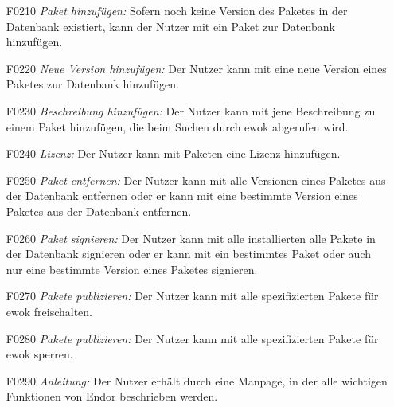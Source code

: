 \begin{itemize}
	\item[F0210] \textit{Paket hinzufügen:} Sofern noch keine Version des Paketes in der Datenbank existiert, kann der Nutzer mit  ein Paket zur Datenbank hinzufügen.
	\item[F0220] \textit{Neue Version hinzufügen:} Der Nutzer kann mit  eine neue Version eines Paketes zur Datenbank hinzufügen.
	\item[F0230] \textit{Beschreibung hinzufügen:} Der Nutzer kann mit  jene Beschreibung zu einem Paket hinzufügen, die beim Suchen durch ewok abgerufen wird.
	\item[F0240] \textit{Lizenz:} Der Nutzer kann mit  Paketen eine Lizenz hinzufügen.
	\item[F0250] \textit{Paket entfernen:} Der Nutzer kann mit  alle Versionen eines Paketes aus der Datenbank entfernen oder er kann mit  eine bestimmte Version eines Paketes aus der Datenbank entfernen.
	\item[F0260] \textit{Paket signieren:} Der Nutzer kann mit  alle installierten alle Pakete in der Datenbank signieren oder er kann mit  ein bestimmtes Paket oder auch nur eine bestimmte Version eines Paketes signieren.
	\item[F0270] \textit{Pakete publizieren:} Der Nutzer kann mit  alle spezifizierten Pakete für ewok freischalten.
	\item[F0280] \textit{Pakete publizieren:} Der Nutzer kann mit  alle spezifizierten Pakete für ewok sperren.
	\item[F0290] \textit{Anleitung:} Der Nutzer erhält durch  eine Manpage, in der alle wichtigen Funktionen von Endor beschrieben werden.


\end{itemize}
